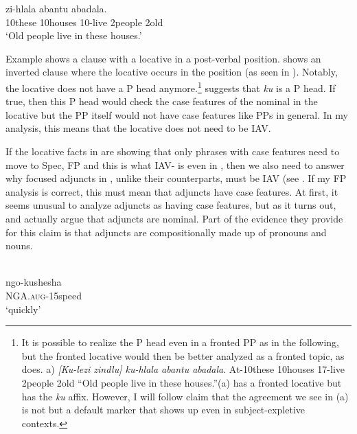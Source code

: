 \documentclass[output=paper,newtxmath,modfonts,nonflat,hidelinks]{langsci/langscibook}
\begin{document}
\ex\label{ex:selvanathan:16b}
	  zi-hlala  abantu  abadala. \\
	10these   10houses   10-live   2people   2old\\
	\glt `Old people live in these houses.' 
\z
\z

\largerpage[-1]
Example  shows a clause with a locative in a post-verbal position.  shows an inverted clause where the locative occurs in the  position (as seen in ). Notably, the locative does not have a P head anymore.\footnote{It is possible to realize the P head even in a fronted PP as in the following, but the fronted locative would then be better analyzed as a fronted topic, as \citet{Buell2007} does. a)   \citep[108]{Buell2007}  \textit{[Ku-lezi  zindlu]    ku-hlala  abantu   abadala}.   At-10these   10houses   17-live     2people  2old  “Old people live in these houses.”(a) has a fronted locative but has the \textit{ku} affix. However, I will follow  claim that the agreement we see in (a) is not  but a default marker that shows up even in subject-expletive contexts.}  suggests that \textit{ku} is a P head. If true, then this P head would check the case features of the nominal in the locative but the PP itself would not have case features like PPs in general. In my analysis, this means that the locative does not need to be IAV. 

If the locative facts in  are showing that only phrases with case features need to move to Spec, FP and this is what IAV- is even in , then we also need to answer why focused adjuncts in , unlike their  counterparts, must be IAV (see . If my FP analysis is correct, this must mean that  adjuncts have case features. At first, it seems unusual to analyze adjuncts as having case features, but as it turns out, \citet{Halpert2012} and \citet{chengdowning2014} actually argue that  adjuncts are nominal. Part of the evidence they provide for this claim is that  adjuncts are compositionally made up of pronouns and nouns. 

\ea\label{ex:selvanathan:17}
\\
\ea\label{ex:selvanathan:17a}
\gll ngo-kushesha\\
NGA.\textsc{aug}{}-15speed\\
\glt `quickly'
\end{document}
